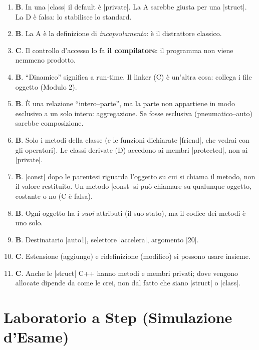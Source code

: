 \begin{soluzione}
\begin{enumerate}[label=\textbf{\arabic*.}]
  \item \textbf{B}. In una \cc|class| il default è \cc|private|. La A sarebbe
        giusta per una \cc|struct|. La D è falsa: lo stabilisce lo standard.
  \item \textbf{B}. La A è la definizione di \emph{incapsulamento}: è il
        distrattore classico.
  \item \textbf{C}. Il controllo d'accesso lo fa \textbf{il compilatore}: il
        programma non viene nemmeno prodotto.
  \item \textbf{B}. ``Dinamico'' significa a run-time. Il linker (C) è un'altra
        cosa: collega i file oggetto (Modulo 2).
  \item \textbf{B}. È una relazione ``intero--parte'', ma la parte non appartiene
        in modo esclusivo a un solo intero: aggregazione. Se fosse esclusiva
        (pneumatico--auto) sarebbe composizione.
  \item \textbf{B}. Solo i metodi della classe (e le funzioni dichiarate
        \cc|friend|, che vedrai con gli operatori). Le classi derivate (D)
        accedono ai membri \cc|protected|, non ai \cc|private|.
  \item \textbf{B}. \cc|const| dopo le parentesi riguarda l'oggetto su cui si
        chiama il metodo, non il valore restituito. Un metodo \cc|const| si può
        chiamare su qualunque oggetto, costante o no (C è falsa).
  \item \textbf{B}. Ogni oggetto ha i \emph{suoi} attributi (il suo stato), ma il
        codice dei metodi è uno solo.
  \item \textbf{B}. Destinatario \cc|auto1|, selettore \cc|accelera|, argomento \cc|20|.
  \item \textbf{C}. Estensione (aggiungo) e ridefinizione (modifico) si possono
        usare insieme.
  \item \textbf{C}. Anche le \cc|struct| C++ hanno metodi e membri privati; dove
        vengono allocate dipende da come le crei, non dal fatto che siano
        \cc|struct| o \cc|class|.
\end{enumerate}
\end{soluzione}

\section{Laboratorio a Step (Simulazione d'Esame)}

